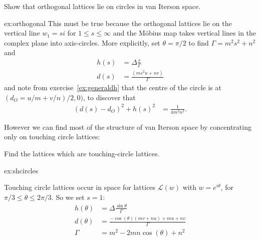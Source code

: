 \begin{jExercise}\label{ex:orthogonal}
Show that orthogonal lattices lie on circles in van Iterson space. 
\end{jExercise}
\begin{jAnswer}{ex:orthogonal}{
		This must be true because the orthogonal  lattices lie on the vertical line $w_1=si$ for $1\leq s\leq \infty$ and the  M\"obius map takes vertical lines in the complex plane into axis-circles. More explicitly, set $\theta=\pi/2$ 
 to find $\Gamma=m^2 s^2+n^2$ and 
		\begin{align}
			h(s)  &=  \Delta\frac{s}{\Gamma }
			\\
			d(s) &= \frac{(m s^2 u + n v)}{\Gamma}
		\end{align}
		and note from exercise~\eqref{ex:generaldh} that the centre of the circle is at $(d_O=u/m+v/n)/2,0)$, to discover that 
		\begin{align}
			\left( d(s)- d_O\right)^2 + h(s)^2 &= \frac{1}{4 m^2 n^2}.
		\end{align}
	}
\end{jAnswer}

However we can find most of the structure of van Iterson space by concentrating only on touching circle lattices:



\begin{jExercise}\label{ex:shcircles}{
	Find  the  lattices which are touching-circle lattices.
}\end{jExercise}

\begin{jAnswer}{ex:shcircles}{

Touching circle lattices occur in  space for lattices $\mathcal{L}(w)$ with $w=e^{i\theta}$, for $\pi/3\leq\theta\leq2\pi/3$. So we set $s=1$:
\begin{align}
	h(\theta) &=\Delta
\frac{	\sin\theta}{\Gamma}
\\
	d(\theta) &=\frac{-\cos (\theta ) (m v+n u)+m u+n v}{\Gamma }
\\
\Gamma&=m^2-2 m n \cos (\theta )+n^2
	\label{eq:tchd}
\end{align}
}\end{jAnswer}



